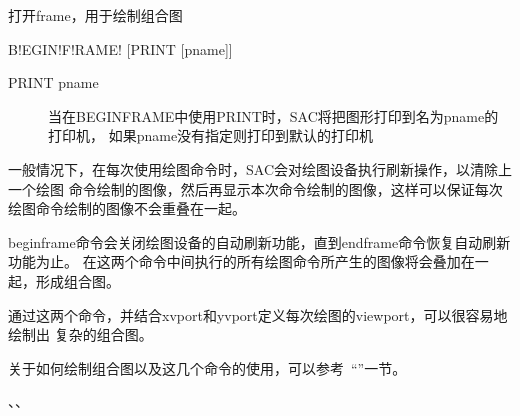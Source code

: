 \label{cmd:beginframe}

打开frame，用于绘制组合图

\begin{SACSTX}
B!EGIN!F!RAME! [PRINT [pname]]
\end{SACSTX}

\begin{description}
\item [PRINT pname] 当在BEGINFRAME中使用PRINT时，SAC将把图形打印到名为pname的打印机，
    如果pname没有指定则打印到默认的打印机
\end{description}

一般情况下，在每次使用绘图命令时，SAC会对绘图设备执行刷新操作，以清除上一个绘图
命令绘制的图像，然后再显示本次命令绘制的图像，这样可以保证每次绘图命令绘制的图像不会重叠在一起。

beginframe命令会关闭绘图设备的自动刷新功能，直到endframe命令恢复自动刷新功能为止。
在这两个命令中间执行的所有绘图命令所产生的图像将会叠加在一起，形成组合图。

通过这两个命令，并结合xvport和yvport定义每次绘图的viewport，可以很容易地绘制出
复杂的组合图。

关于如何绘制组合图以及这几个命令的使用，可以参考~``''一节。

、、
